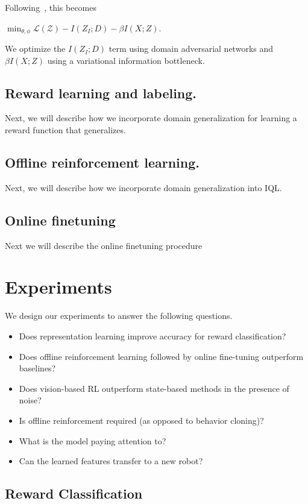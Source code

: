 \documentclass[letterpaper, 10 pt, conference, final]{ieeeconf}   %
\begin{document}
Following~\citet{alemi2017vib}, this becomes

$\min_{\theta, \phi} \mathcal{L(Z)} - I(Z_I; D) - \beta I(X; Z)$.

We optimize the $I(Z_I; D)$ term using domain adversarial networks and $\beta I(X; Z)$ using a variational information bottleneck.

\subsection{Reward learning and labeling.}

Next, we will describe how we incorporate domain generalization for learning a reward function that generalizes.

\subsection{Offline reinforcement learning.}

Next, we will describe how we incorporate domain generalization into IQL.

\subsection{Online finetuning}

Next we will describe the online finetuning procedure

\section{Experiments}

We design our experiments to answer the following questions.
\begin{itemize}
    \item Does representation learning improve accuracy for reward classification?
    \item Does offline reinforcement learning followed by online fine-tuning outperform baselines?
    \item Does vision-based RL outperform state-based methods in the presence of noise?
    \item Is offline reinforcement required (as opposed to behavior cloning)?
    \item What is the model paying attention to?
    \item Can the learned features transfer to a new robot?
\end{itemize}

\subsection{Reward Classification}
\end{document}
